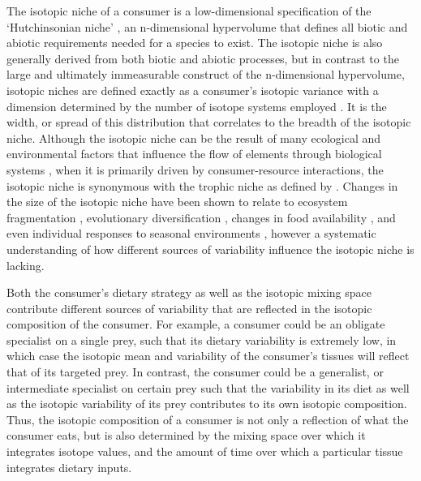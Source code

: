 \documentclass{frontiersSCNS}
\begin{document}
The isotopic niche of a consumer is a low-dimensional specification of the `Hutchinsonian niche' \citep{Hutchinson:1957tg}, an n-dimensional hypervolume that defines all biotic and abiotic requirements needed for a species to exist.
The isotopic niche is also generally derived from both biotic and abiotic processes, but in contrast to the large and ultimately immeasurable construct of the n-dimensional hypervolume, isotopic niches are defined exactly as a consumer's isotopic variance with a dimension determined by the number of isotope systems employed \citep{Bearhop:2004im,Newsome:2007tz,Newsome:WhhVfocb,delRio:2011p2553,Jackson:2011kd}.
It is the width, or spread of this distribution that correlates to the breadth of the isotopic niche.
Although the isotopic niche can be the result of many ecological and environmental factors that influence the flow of elements through biological systems \citep{Araujo:2007iua}, when it is primarily driven by consumer-resource interactions, the isotopic niche is synonymous with the trophic niche as defined by \citet{Bearhop:2004im}.
Changes in the size of the isotopic niche have been shown to relate to ecosystem fragmentation \citep{Layman:2007ky}, evolutionary diversification \citep{Fedosov:2014hm}, changes in food availability \citep{Lehmann:2015db}, and even individual responses to seasonal environments \citep{delRio:2011p2553}, however a systematic understanding of how different sources of variability influence the isotopic niche is lacking.


Both the consumer's dietary strategy as well as the isotopic mixing space contribute different sources of variability that are reflected in the isotopic composition of the consumer.
For example, a consumer could be an obligate specialist on a single prey, such that its dietary variability is extremely low, in which case the isotopic mean and variability of the consumer's tissues will reflect that of its targeted prey.
In contrast, the consumer could be a generalist, or intermediate specialist on certain prey such that the variability in its diet as well as the isotopic variability of its prey contributes to its own isotopic composition.
Thus, the isotopic composition of a consumer is not only a reflection of what the consumer eats, but is also determined by the mixing space over which it integrates isotope values, and the amount of time over which a particular tissue integrates dietary inputs.
\end{document}
